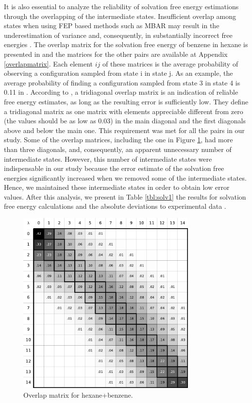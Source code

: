 It is also essential to analyze the reliability of solvation free energy estimations through the overlapping of the intermediate states. Insufficient overlap among states when using FEP based methods such as MBAR may result in the underestimation of variance and, consequently, in substantially incorrect free energies \cite{klimovich}. The overlap matrix for the solvation free energy of benzene in hexane is presented in  and the matrices for the other pairs are available at Appendix \ref{overlapmatrix}. Each element $ij$ of these matrices is the average probability of observing a configuration sampled from state i in state j. As an example, the average probability of finding a configuration sampled from state 3 in state 4 is 0.11 in . According to , a tridiagonal overlap matrix is an indication of reliable free energy estimates, as long as the resulting error is sufficiently low. They define a tridiagonal matrix as one matrix with elements appreciable different from zero (the values should be as low as 0.03) in the main diagonal and the first diagonals above and below the main one. This requirement was met for all the pairs in our study. Some of the overlap matrices, including the one in Figure \ref{fig:hexove}, had more than three diagonals, and, consequently, an apparent unnecessary number of intermediate states. However, this number of intermediate states were indispensable in our study because the error estimate of the solvation free energies significantly increased when we removed some of the intermediate states. Hence, we maintained these intermediate states in order to obtain low error values. After this analysis, we present in Table \ref{tbl:solv1} the results for solvation free energy calculations and the absolute deviations to experimental data \cite{doi:10.1021/ci034120c}.  

\begin{figure}[h]
    \centering
    \includegraphics[width=0.8\textwidth]{Figures/ohex_benz}
    \caption{Overlap matrix for hexane+benzene.}
    \label{fig:hexove}
\end{figure}

